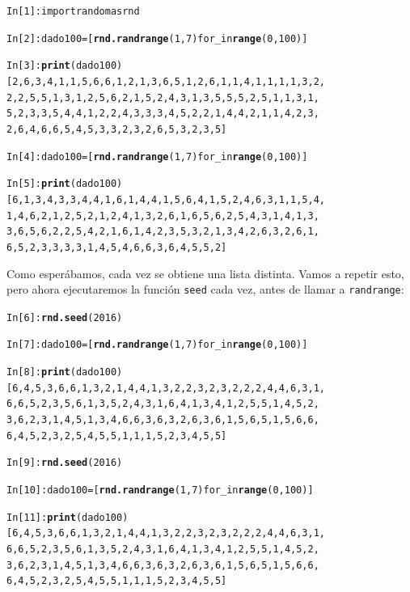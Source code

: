 \documentclass[10pt,a4paper]{article}\usepackage[]{graphicx}\usepackage[]{color}
\makeatletter
\newcommand{\hlkwd}[1]{\textcolor[rgb]{0.737,0.353,0.396}{\textbf{#1}}}%
\newenvironment{kframe}{%
 \def\at@end@of@kframe{}%
 \ifinner\ifhmode%
  \def\at@end@of@kframe{\end{minipage}}%
  \begin{minipage}{\columnwidth}%
 \fi\fi%
 \def\FrameCommand##1{\hskip\@totalleftmargin \hskip-\fboxsep
 \colorbox{shadecolor}{##1}\hskip-\fboxsep
     \hskip-\linewidth \hskip-\@totalleftmargin \hskip\columnwidth}%
 \MakeFramed {\advance\hsize-\width
   \@totalleftmargin\z@ \linewidth\hsize
   \@setminipage}}%
 {\par\unskip\endMakeFramed%
 \at@end@of@kframe}
\newenvironment{knitrout}{}{} %
\makeatother
\begin{document}
\begin{knitrout}
\color{fgcolor}\begin{kframe}
\begin{alltt}
In [1]: import random as rnd

In [2]: dado100 = [\hlkwd{rnd.randrange}(1, 7) for _ in \hlkwd{range}(0, 100)]

In [3]: \hlkwd{print}(dado100)
[2, 6, 3, 4, 1, 1, 5, 6, 6, 1, 2, 1, 3, 6, 5, 1, 2, 6, 1, 1, 4, 1, 1, 1, 1, 3, 2,
2, 2, 5, 5, 1, 3, 1, 2, 5, 6, 2, 1, 5, 2, 4, 3, 1, 3, 5, 5, 5, 2, 5, 1, 1, 3, 1,
5, 2, 3, 3, 5, 4, 4, 1, 2, 2, 4, 3, 3, 3, 4, 5, 2, 2, 1, 4, 4, 2, 1, 1, 4, 2, 3,
2, 6, 4, 6, 6, 5, 4, 5, 3, 3, 2, 3, 2, 6, 5, 3, 2, 3, 5]

In [4]: dado100 = [\hlkwd{rnd.randrange}(1, 7) for _ in \hlkwd{range}(0, 100)]

In [5]: \hlkwd{print}(dado100)
[6, 1, 3, 4, 3, 3, 4, 4, 1, 6, 1, 4, 4, 1, 5, 6, 4, 1, 5, 2, 4, 6, 3, 1, 1, 5, 4,
1, 4, 6, 2, 1, 2, 5, 2, 1, 2, 4, 1, 3, 2, 6, 1, 6, 5, 6, 2, 5, 4, 3, 1, 4, 1, 3,
3, 6, 5, 6, 2, 2, 5, 4, 2, 1, 6, 1, 4, 2, 3, 5, 3, 2, 1, 3, 4, 2, 6, 3, 2, 6, 1,
6, 5, 2, 3, 3, 3, 3, 1, 4, 5, 4, 6, 6, 3, 6, 4, 5, 5, 2]
\end{alltt}
\end{kframe}
\end{knitrout}
Como esperábamos, cada vez se obtiene una lista distinta. Vamos a repetir esto, pero ahora ejecutaremos la función {\tt seed} cada vez, antes de llamar a {\tt randrange}:
\begin{knitrout}
\color{fgcolor}\begin{kframe}
\begin{alltt}
In [6]: \hlkwd{rnd.seed}(2016)

In [7]: dado100 = [\hlkwd{rnd.randrange}(1, 7) for _ in \hlkwd{range}(0, 100)]

In [8]: \hlkwd{print}(dado100)
[6, 4, 5, 3, 6, 6, 1, 3, 2, 1, 4, 4, 1, 3, 2, 2, 3, 2, 3, 2, 2, 2, 4, 4, 6, 3, 1,
6, 6, 5, 2, 3, 5, 6, 1, 3, 5, 2, 4, 3, 1, 6, 4, 1, 3, 4, 1, 2, 5, 5, 1, 4, 5, 2,
3, 6, 2, 3, 1, 4, 5, 1, 3, 4, 6, 6, 3, 6, 3, 2, 6, 3, 6, 1, 5, 6, 5, 1, 5, 6, 6,
6, 4, 5, 2, 3, 2, 5, 4, 5, 5, 1, 1, 1, 5, 2, 3, 4, 5, 5]

In [9]: \hlkwd{rnd.seed}(2016)

In [10]: dado100 = [\hlkwd{rnd.randrange}(1, 7) for _ in \hlkwd{range}(0, 100)]

In [11]: \hlkwd{print}(dado100)
[6, 4, 5, 3, 6, 6, 1, 3, 2, 1, 4, 4, 1, 3, 2, 2, 3, 2, 3, 2, 2, 2, 4, 4, 6, 3, 1,
6, 6, 5, 2, 3, 5, 6, 1, 3, 5, 2, 4, 3, 1, 6, 4, 1, 3, 4, 1, 2, 5, 5, 1, 4, 5, 2,
3, 6, 2, 3, 1, 4, 5, 1, 3, 4, 6, 6, 3, 6, 3, 2, 6, 3, 6, 1, 5, 6, 5, 1, 5, 6, 6,
6, 4, 5, 2, 3, 2, 5, 4, 5, 5, 1, 1, 1, 5, 2, 3, 4, 5, 5]
\end{alltt}
\end{kframe}
\end{knitrout}
\end{document}

